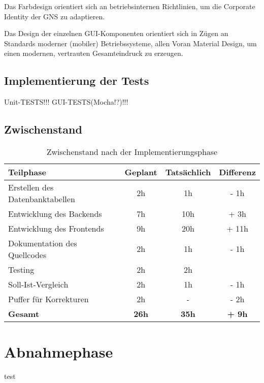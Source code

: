 \documentclass[12pt, xcolor=dvipsnames]{scrartcl}
\begin{document}
Das Farbdesign orientiert sich an betriebsinternen Richtlinien, um die Corporate Identity der GNS zu adaptieren.

Das Design der einzelnen GUI-Komponenten orientiert sich in Zügen an Standards moderner (mobiler) Betriebssysteme, allen Voran Material Design, um einen modernen, vertrauten Gesamteindruck zu erzeugen.

\subsection{Implementierung der Tests}

Unit-TESTS!!! 
GUI-TESTS(Mocha!?)!!!

\subsection{Zwischenstand}

\begin{table}[H]
	\centering
	\begin{tabular}{lccc}

		\rowcolor{white!15}				
		\textbf{Teilphase} & \textbf{Geplant} & \textbf{Tatsächlich} & \textbf{Differenz} \\\hline		
		

		Erstellen des Datenbanktabellen & 2h & 1h & - 1h\\	    
	    Entwicklung des Backends & 7h & 10h & + 3h\\	    
	    Entwicklung des Frontends & 9h & 20h & + 11h\\	     
	    Dokumentation des Quellcodes & 2h & 1h & - 1h \\	      
   	    Testing & 2h & 2h & \\
   	    Soll-Ist-Vergleich & 2h & 1h & - 1h \\
   	    Puffer für Korrekturen & 2h & - & - 2h\\\hline   	    	    	    

		\rowcolor{white!15}				
		\textbf{Gesamt} & \textbf{26h} & \textbf{35h} & \textbf{+ 9h} \\			

	    
	\end{tabular}
	\caption{Zwischenstand nach der Implementierungsphase}
	\label{tab:zwischenstand_implementierungsphase}
	\end{table}

\section{Abnahmephase}
	test
\end{document}
